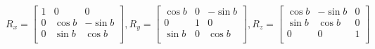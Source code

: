 \documentclass[12pt]{article}
\begin{document}
\[
    R_x = \begin{bmatrix}
        1 & 0 & 0 \\
        0 & \cos b & -\sin b \\
        0 & \sin b & \cos b \\
    \end{bmatrix},
    R_y = \begin{bmatrix}
        \cos b & 0 & -\sin b \\
        0 & 1 & 0 \\
        \sin b & 0 & \cos b \\
    \end{bmatrix},
    R_z = \begin{bmatrix}
        \cos b & -\sin b & 0 \\
        \sin b & \cos b & 0 \\
        0 & 0 & 1 \\
    \end{bmatrix}
\]
\end{document}
